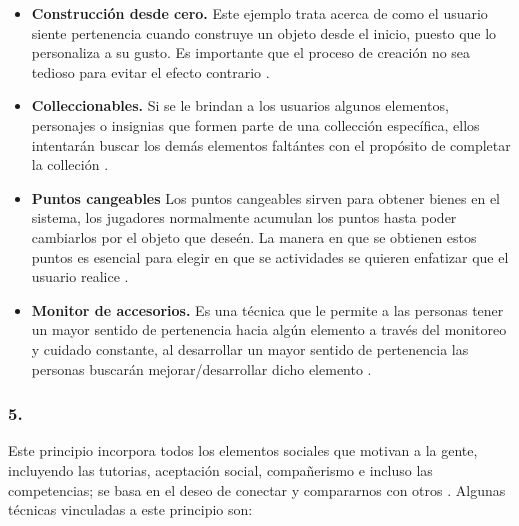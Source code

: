     \begin{itemize}
    \item
    {\bf Construcción desde cero.}
        Este ejemplo trata acerca de como el usuario siente pertenencia cuando construye
        un objeto desde el inicio, puesto que lo personaliza a su gusto. Es importante que
        el proceso de creación no sea tedioso para evitar el efecto contrario \cite[p. 182]{Octalysis}.
        
    \item
    {\bf Colleccionables.}
        Si se le brindan a los usuarios algunos elementos, personajes o insignias que
        formen parte de una collección específica, ellos intentarán buscar los demás
        elementos faltántes con el propósito de completar la colleción \cite[p. 183]{Octalysis}.
        
    \item
    {\bf Puntos cangeables}
        Los puntos cangeables sirven para obtener bienes en el sistema, los jugadores
        normalmente acumulan los puntos hasta poder cambiarlos por el objeto que deseén.
        La manera en que se obtienen estos puntos es esencial para elegir en que se
        actividades se quieren enfatizar que el usuario realice \cite[p. 187]{Octalysis}.
        
    \item
    {\bf Monitor de accesorios.}
        Es una técnica que le permite a las personas tener un mayor sentido de pertenencia
        hacia algún elemento a través del monitoreo y cuidado constante, al desarrollar un
        mayor sentido de pertenencia las personas buscarán mejorar/desarrollar dicho elemento
        \cite[p. 189]{Octalysis}.

    \end{itemize}
    
\subsubsection{5. \principioV} \label{subsec:principioV}
    
 Este principio incorpora todos los elementos sociales que motivan a la gente, incluyendo
 las tutorias, aceptación social, compañerismo e incluso las competencias; se basa en el
 deseo de conectar y compararnos con otros \cite[pp. 27, 197]{Octalysis}. Algunas técnicas
 vinculadas a este principio son:
    
